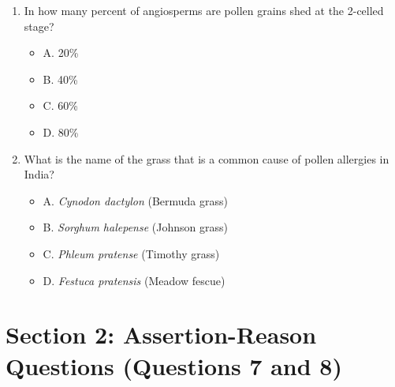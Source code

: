 \documentclass{article}
\begin{document}
\begin{enumerate}
    \item In how many percent of angiosperms are pollen grains shed at the 2-celled stage?
        \begin{itemize}
            \item A. 20\%
            \item B. 40\%
            \item C. 60\%
            \item D. 80\%
        \end{itemize}
        
    \item What is the name of the grass that is a common cause of pollen allergies in India?
        \begin{itemize}
            \item A. \textit{Cynodon dactylon} (Bermuda grass)
            \item B. \textit{Sorghum halepense} (Johnson grass)
            \item C. \textit{Phleum pratense} (Timothy grass)
            \item D. \textit{Festuca pratensis} (Meadow fescue)
        \end{itemize}
\end{enumerate}

\section*{Section 2: Assertion-Reason Questions (Questions 7 and 8)}
\end{document}
